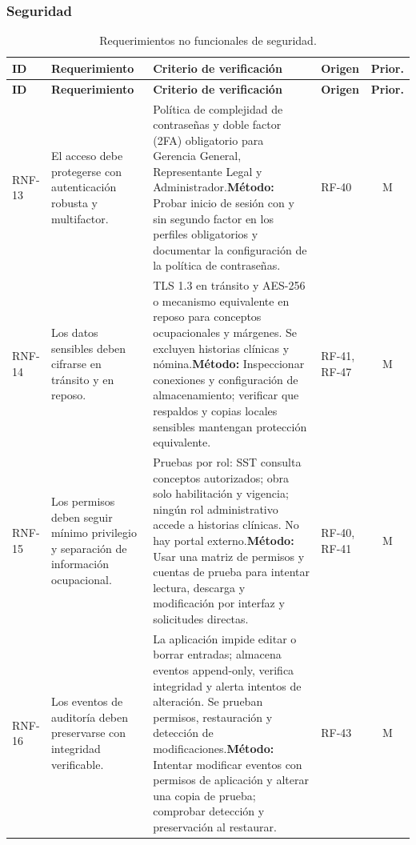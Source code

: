 \documentclass[12pt,letterpaper]{article}
\begin{document}
\subsubsection{Seguridad}

{\small
\begin{longtable}{@{}L{1.8cm} L{4.65cm} L{4.75cm} L{2.1cm} c@{}}
\caption{Requerimientos no funcionales de seguridad.}\\
\toprule{}
\textbf{ID} & \textbf{Requerimiento} & \textbf{Criterio de verificación} & \textbf{Origen} & \textbf{Prior.} \\
\midrule
\endfirsthead
\toprule{}
\textbf{ID} & \textbf{Requerimiento} & \textbf{Criterio de verificación} & \textbf{Origen} & \textbf{Prior.} \\
\midrule
\endhead
\bottomrule
\endfoot
RNF-13 & El acceso debe protegerse con autenticación robusta y multifactor. & Política de complejidad de contraseñas y doble factor (2FA) obligatorio para Gerencia General, Representante Legal y Administrador.\newline \textbf{Método:} Probar inicio de sesión con y sin segundo factor en los perfiles obligatorios y documentar la configuración de la política de contraseñas. & RF-40 & M \\
RNF-14 & Los datos sensibles deben cifrarse en tránsito y en reposo. & TLS 1.3 en tránsito y AES-256 o mecanismo equivalente en reposo para conceptos ocupacionales y márgenes. Se excluyen historias clínicas y nómina.\newline \textbf{Método:} Inspeccionar conexiones y configuración de almacenamiento; verificar que respaldos y copias locales sensibles mantengan protección equivalente. & RF-41, RF-47 & M \\
RNF-15 & Los permisos deben seguir mínimo privilegio y separación de información ocupacional. & Pruebas por rol: SST consulta conceptos autorizados; obra solo habilitación y vigencia; ningún rol administrativo accede a historias clínicas. No hay portal externo.\newline \textbf{Método:} Usar una matriz de permisos y cuentas de prueba para intentar lectura, descarga y modificación por interfaz y solicitudes directas. & RF-40, RF-41 & M \\
RNF-16 & Los eventos de auditoría deben preservarse con integridad verificable. & La aplicación impide editar o borrar entradas; almacena eventos append-only, verifica integridad y alerta intentos de alteración. Se prueban permisos, restauración y detección de modificaciones.\newline \textbf{Método:} Intentar modificar eventos con permisos de aplicación y alterar una copia de prueba; comprobar detección y preservación al restaurar. & RF-43 & M \\

\end{longtable}}
\end{document}
